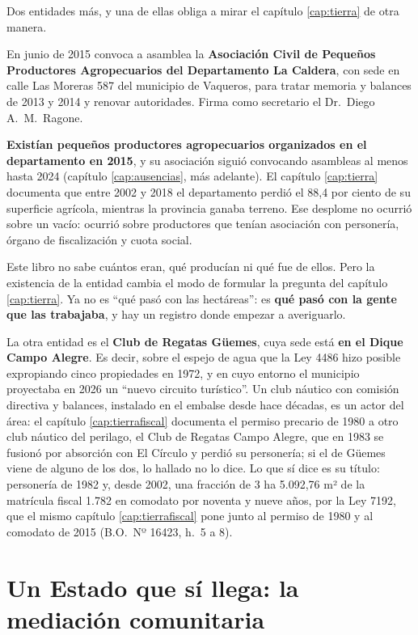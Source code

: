 \begin{cautela}
Dos entidades más, y una de ellas obliga a mirar el capítulo \ref{cap:tierra} de otra manera.

En junio de 2015 convoca a asamblea la \textbf{Asociación Civil de Pequeños Productores Agropecuarios del Departamento La Caldera}, con sede en calle Las Moreras 587 del municipio de Vaqueros, para tratar memoria y balances de 2013 y 2014 y renovar autoridades. Firma como secretario el Dr.\ Diego A.\ M.\ Ragone.

\textbf{Existían pequeños productores agropecuarios organizados en el departamento en 2015}, y su asociación siguió convocando asambleas al menos hasta 2024 (capítulo \ref{cap:ausencias}, más adelante). El capítulo \ref{cap:tierra} documenta que entre 2002 y 2018 el departamento perdió el 88,4 por ciento de su superficie agrícola, mientras la provincia ganaba terreno. Ese desplome no ocurrió sobre un vacío: ocurrió sobre productores que tenían asociación con personería, órgano de fiscalización y cuota social.

Este libro no sabe cuántos eran, qué producían ni qué fue de ellos. Pero la existencia de la entidad cambia el modo de formular la pregunta del capítulo \ref{cap:tierra}. Ya no es ``qué pasó con las hectáreas'': es \textbf{qué pasó con la gente que las trabajaba}, y hay un registro donde empezar a averiguarlo.

La otra entidad es el \textbf{Club de Regatas Güemes}, cuya sede está \textbf{en el Dique Campo Alegre}. Es decir, sobre el espejo de agua que la Ley 4486 hizo posible expropiando cinco propiedades en 1972, y en cuyo entorno el municipio proyectaba en 2026 un ``nuevo circuito turístico''. Un club náutico con comisión directiva y balances, instalado en el embalse desde hace décadas, es un actor del área: el capítulo \ref{cap:tierrafiscal} documenta el permiso precario de 1980 a otro club náutico del perilago, el Club de Regatas Campo Alegre, que en 1983 se fusionó por absorción con El Círculo y perdió su personería; si el de Güemes viene de alguno de los dos, lo hallado no lo dice. Lo que sí dice es su título: personería de 1982 y, desde 2002, una fracción de 3 ha 5.092,76 m² de la matrícula fiscal 1.782 en comodato por noventa y nueve años, por la Ley 7192, que el mismo capítulo \ref{cap:tierrafiscal} pone junto al permiso de 1980 y al comodato de 2015 (B.O.\ Nº 16423, h.\ 5 a 8).
\end{cautela}

\section{Un Estado que sí llega: la mediación comunitaria}

